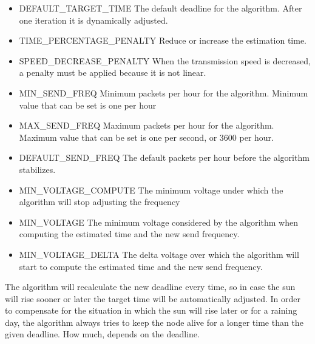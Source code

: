 \begin{itemize}
    \item DEFAULT\_TARGET\_TIME The default deadline for the algorithm. After one iteration it is
        dynamically adjusted.
    \item TIME\_PERCENTAGE\_PENALTY Reduce or increase the estimation time.
    \item SPEED\_DECREASE\_PENALTY When the transmission speed is decreased, a penalty must be applied
        because it is not linear.
    \item MIN\_SEND\_FREQ  Minimum packets per hour for the algorithm. Minimum value that can be
        set is one per hour
    \item MAX\_SEND\_FREQ  Maximum packets per hour for the algorithm. Maximum value that can be
        set is one per second, or 3600 per hour.
    \item DEFAULT\_SEND\_FREQ The default packets per hour before the algorithm stabilizes.
    \item MIN\_VOLTAGE\_COMPUTE The minimum voltage under which the algorithm will stop adjusting
        the frequency
    \item MIN\_VOLTAGE The minimum voltage considered by the algorithm when computing the estimated
        time and the new send frequency.
    \item MIN\_VOLTAGE\_DELTA The delta voltage over which the algorithm will start to compute the
        estimated time and the new send frequency.
\end{itemize}


The algorithm will recalculate the new deadline every time, so in case the sun will rise sooner or later the
target time will be automatically adjusted. In order to compensate for the situation in which the
sun will rise later or for a raining day, the algorithm always tries to keep the node alive for a
longer time than the given deadline. How much, depends on the deadline.


